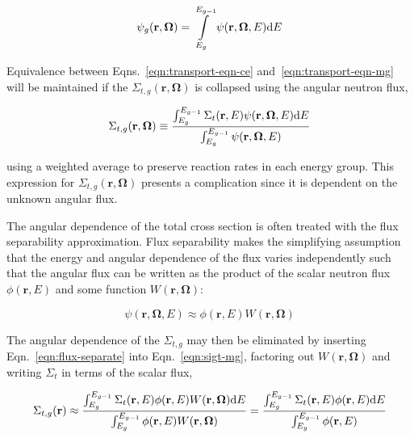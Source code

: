 \begin{dmath}
\label{eqn:groupwise-flux}
\psi_{g}(\mathbf{r},\mathbf{\Omega}) = \int\displaylimits_{E_{g}}^{E_{g-1}} \psi(\mathbf{r},\mathbf{\Omega},E)\mathrm{d}E
\end{dmath}


Equivalence between Eqns.~\ref{eqn:transport-eqn-ce} and~\ref{eqn:transport-eqn-mg} will be maintained if the $\Sigma_{t,g}(\mathbf{r},\mathbf{\Omega})$ is collapsed using the angular neutron flux,

\begin{dmath}
\label{eqn:sigt-mg}
\Sigma_{t,g}(\mathbf{r},\mathbf{\Omega}) \equiv \frac{\int\displaylimits_{E_{g}}^{E_{g-1}} \Sigma_{t}(\mathbf{r},E)\psi(\mathbf{r},\mathbf{\Omega},E)\mathrm{d}E}{\int\displaylimits_{E_{g}}^{E_{g-1}} \psi(\mathbf{r},\mathbf{\Omega},E)}
\end{dmath}

\noindent using a weighted average to preserve reaction rates in each energy group. This expression for $\Sigma_{t,g}(\mathbf{r},\mathbf{\Omega})$ presents a complication since it is dependent on the unknown angular flux.

The angular dependence of the total cross section is often treated with the flux separability approximation. Flux separability makes the simplifying assumption that the energy and angular dependence of the flux varies independently such that the angular flux can be written as the product of the scalar neutron flux $\phi(\mathbf{r},E)$ and some function $W(\mathbf{r}, \mathbf{\Omega})$:

\begin{dmath}
\label{eqn:flux-separate}
\psi(\mathbf{r},\mathbf{\Omega},E) \approx \phi(\mathbf{r},E) W(\mathbf{r},\mathbf{\Omega})
\end{dmath}

\noindent The angular dependence of the $\Sigma_{t,g}$ may then be eliminated by inserting Eqn.~\ref{eqn:flux-separate} into Eqn.~\ref{eqn:sigt-mg}, factoring out $W(\mathbf{r},\mathbf{\Omega})$ and writing $\Sigma_{t}$ in terms of the scalar flux,

\begin{dmath}
\label{eqn:sigt-mg-scalar}
\Sigma_{t,g}(\mathbf{r}) \approx \frac{\int\displaylimits_{E_{g}}^{E_{g-1}} \Sigma_{t}(\mathbf{r},E)\phi(\mathbf{r},E)W(\mathbf{r},\mathbf{\Omega})\mathrm{d}E}{\int\displaylimits_{E_{g}}^{E_{g-1}} \phi(\mathbf{r},E)W(\mathbf{r},\mathbf{\Omega})} = \frac{\int\displaylimits_{E_{g}}^{E_{g-1}} \Sigma_{t}(\mathbf{r},E)\phi(\mathbf{r},E)\mathrm{d}E}{\int\displaylimits_{E_{g}}^{E_{g-1}} \phi(\mathbf{r},E)}
\end{dmath}

